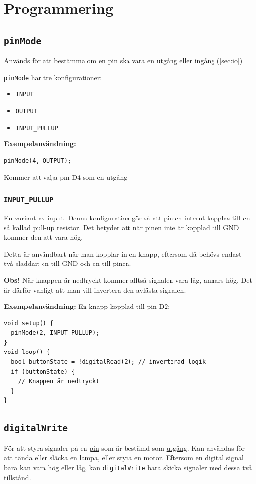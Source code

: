 \documentclass[11pt]{article}
\begin{document}
\newpage
\section{Programmering}
\subsection{\texttt{pinMode}}\label{sec:pinmode}
Används för att bestämma om en \hyperref[sec:pin]{pin} ska vara en utgång eller
ingång (\ref{sec:io})

\texttt{pinMode} har tre konfigurationer:
\begin{itemize}
  \item \texttt{INPUT}
  \item \texttt{OUTPUT}
  \item \hyperref[sec:input_pullup]{\texttt{INPUT\_PULLUP}}
\end{itemize}

\textbf{Exempelanvändning:}
\begin{lstlisting}
pinMode(4, OUTPUT);
\end{lstlisting}
Kommer att välja pin D4 som en utgång.

\subsubsection{\texttt{INPUT\_PULLUP}}\label{sec:input_pullup}
En variant av \hyperref[sec:input]{input}. Denna konfiguration gör så att
pin:en internt kopplas till en så kallad pull-up resistor.
Det betyder att när pinen inte är kopplad till GND kommer den att vara hög.

Detta är användbart när man kopplar in en knapp, eftersom då behövs endast två
sladdar: en till GND och en till pinen.

\textbf{Obs!} När knappen är nedtryckt kommer alltså signalen vara låg, annars
hög. Det är därför vanligt att man vill invertera den avlästa signalen.

\textbf{Exempelanvändning:}
En knapp kopplad till pin D2:
\begin{lstlisting}
void setup() {
  pinMode(2, INPUT_PULLUP);
}
void loop() {
  bool buttonState = !digitalRead(2); // inverterad logik
  if (buttonState) {
    // Knappen är nedtryckt
  }
}
\end{lstlisting}

\subsection{\texttt{digitalWrite}}
För att styra signaler på en \hyperref[sec:pin]{pin} som är bestämd som
\hyperref[sec:io]{utgång}. Kan användas för att tända eller släcka en lampa,
eller styra en motor. Eftersom en \hyperref[sec:analog-digital]{digital} signal
bara kan vara hög eller låg, kan \texttt{digitalWrite} bara skicka signaler med
dessa två tillstånd.
\end{document}
